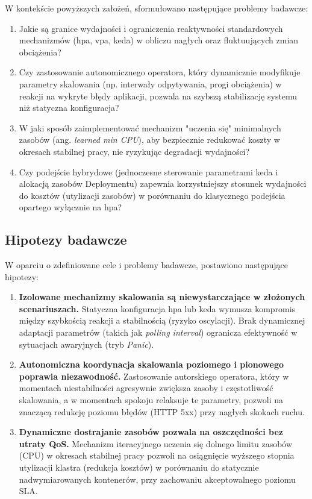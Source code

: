 W kontekście powyższych założeń, sformułowano następujące problemy badawcze:

\begin{enumerate}
    \item Jakie są granice wydajności i ograniczenia reaktywności standardowych mechanizmów (\Gls{hpa}, 
      \Gls{vpa}, \Gls{keda}) w obliczu nagłych oraz fluktuujących zmian obciążenia?
    
    \item Czy zastosowanie autonomicznego operatora, który dynamicznie modyfikuje parametry skalowania 
      (np. interwały odpytywania, progi obciążenia) w reakcji na wykryte błędy aplikacji, pozwala na 
      szybszą stabilizację systemu niż statyczna konfiguracja?
    
    \item W jaki sposób zaimplementować mechanizm "uczenia się" minimalnych zasobów (ang. 
      \textit{learned min CPU}), aby bezpiecznie redukować koszty w okresach stabilnej pracy, nie 
      ryzykując degradacji wydajności?
    
    \item Czy podejście hybrydowe (jednoczesne sterowanie parametrami \Gls{keda} i alokacją zasobów 
      Deploymentu) zapewnia korzystniejszy stosunek wydajności do kosztów (utylizacji zasobów) w porównaniu 
      do klasycznego podejścia opartego wyłącznie na \Gls{hpa}?
    
\end{enumerate}


\subsection{Hipotezy badawcze}

W oparciu o zdefiniowane cele i problemy badawcze, postawiono następujące hipotezy:

\begin{enumerate}
    \item \textbf{Izolowane mechanizmy skalowania są niewystarczające w złożonych scenariuszach.} 
    Statyczna konfiguracja \Gls{hpa} lub \Gls{keda} wymusza kompromis między szybkością reakcji a 
    stabilnością (ryzyko oscylacji). Brak dynamicznej adaptacji parametrów (takich jak \textit{polling interval}) 
    ogranicza efektywność w sytuacjach awaryjnych (tryb \textit{Panic}).
    
    
    \item \textbf{Autonomiczna koordynacja skalowania poziomego i pionowego poprawia niezawodność.} 
    Zastosowanie autorskiego operatora, który w momentach niestabilności agresywnie zwiększa zasoby 
    i częstotliwość skalowania, a w momentach spokoju relaksuje te parametry, pozwoli na znaczącą 
    redukcję poziomu błędów (HTTP 5xx) przy nagłych skokach ruchu.
    
    
    \item \textbf{Dynamiczne dostrajanie zasobów pozwala na oszczędności bez utraty QoS.} 
    Mechanizm iteracyjnego uczenia się dolnego limitu zasobów (CPU) w okresach stabilnej pracy pozwoli 
    na osiągnięcie wyższego stopnia utylizacji klastra (redukcja kosztów) w porównaniu do statycznie 
    nadwymiarowanych kontenerów, przy zachowaniu akceptowalnego poziomu SLA.
\end{enumerate}
